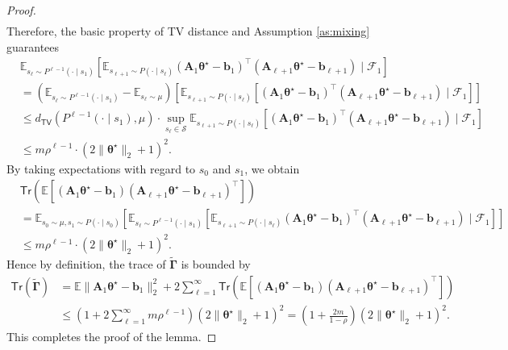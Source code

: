 \begin{proof}
\begin{align*}
\end{align*}
Therefore, the basic property of TV distance and Assumption \ref{as:mixing} guarantees
\begin{align*}
&\mathbb{E}_{s_\ell \sim P^{\ell-1}(\cdot \mid s_1)}[\mathbb{E}_{s_{\ell+1} \sim P(\cdot \mid s_{\ell})} (\bm{A}_1 \bm{\theta}^\star - \bm{b}_1)^\top (\bm{A}_{\ell+1} \bm{\theta}^\star - \bm{b}_{\ell+1}) \mid\mathscr{F}_1] \\ 
&= \left(\mathbb{E}_{s_\ell \sim P^{\ell-1}(\cdot \mid s_1)} - \mathbb{E}_{s_{\ell} \sim \mu}\right)[\mathbb{E}_{s_{\ell+1} \sim P(\cdot \mid s_{\ell})} [(\bm{A}_1 \bm{\theta}^\star - \bm{b}_1)^\top (\bm{A}_{\ell+1} \bm{\theta}^\star - \bm{b}_{\ell+1}) \mid\mathscr{F}_1]] \\ 
&\leq d_{\mathsf{TV}}(P^{\ell-1}(\cdot \mid s_1),\mu) \cdot \sup_{s_{\ell} \in \mathcal{S}} \mathbb{E}_{s_{\ell+1} \sim P(\cdot \mid s_{\ell})} [(\bm{A}_1 \bm{\theta}^\star - \bm{b}_1)^\top (\bm{A}_{\ell+1} \bm{\theta}^\star - \bm{b}_{\ell+1}) \mid\mathscr{F}_1]\\ 
&\leq m\rho^{\ell-1} \cdot (2\|\bm{\theta}^\star\|_2+1)^2.
\end{align*}
By taking expectations with regard to $s_0$ and $s_1$, we obtain
\begin{align*}
&\mathsf{Tr}(\mathbb{E}[(\bm{A}_1 \bm{\theta}^\star - \bm{b}_1)(\bm{A}_{\ell+1} \bm{\theta}^\star - \bm{b}_{\ell+1})^\top]) \\ 
&= \mathbb{E}_{s_0 \sim \mu,s_1 \sim P(\cdot \mid s_0)}[\mathbb{E}_{s_\ell \sim P^{\ell-1}(\cdot \mid s_1)}[\mathbb{E}_{s_{\ell+1} \sim P(\cdot \mid s_{\ell})} (\bm{A}_1 \bm{\theta}^\star - \bm{b}_1)^\top (\bm{A}_{\ell+1} \bm{\theta}^\star - \bm{b}_{\ell+1}) \mid\mathscr{F}_1]] \\ 
&\leq m\rho^{\ell-1} \cdot (2\|\bm{\theta}^\star\|_2+1)^2.
\end{align*}
Hence by definition, the trace of $\tilde{\bm{\Gamma}}$ is bounded by
\begin{align*}
\mathsf{Tr}(\tilde{\bm{\Gamma}}) &= \mathbb{E}\|\bm{A}_1 \bm{\theta}^\star - \bm{b}_1\|_2^2 + 2\sum_{\ell=1}^{\infty} \mathsf{Tr}(\mathbb{E}[(\bm{A}_1 \bm{\theta}^\star - \bm{b}_1)(\bm{A}_{\ell+1} \bm{\theta}^\star - \bm{b}_{\ell+1})^\top]) \\ 
&\leq (1 + 2\sum_{\ell=1}^{\infty} m\rho^{\ell-1}) (2\|\bm{\theta}^\star\|_2+1)^2 = \left(1+\frac{2m}{1-\rho}\right) (2\|\bm{\theta}^\star\|_2+1)^2.
\end{align*}
This completes the proof of the lemma.
\end{proof}

